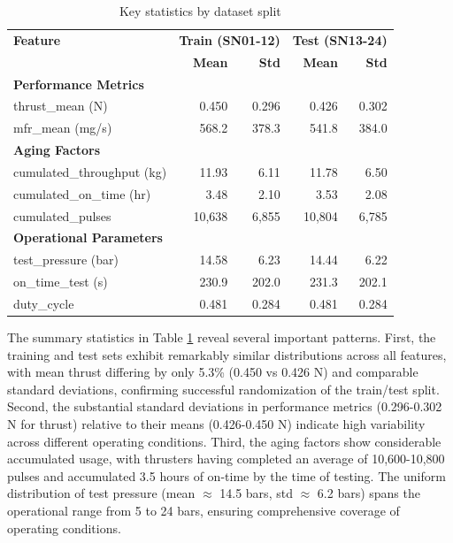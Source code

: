 \documentclass[12pt,a4paper]{article}
\begin{document}
\begin{table}[H]
\centering
\caption{Key statistics by dataset split}
\label{tab:summary_stats}
\small
\begin{tabular}{lrrrr}
\toprule
\textbf{Feature} & \multicolumn{2}{c}{\textbf{Train (SN01-12)}} & \multicolumn{2}{c}{\textbf{Test (SN13-24)}} \\
& \textbf{Mean} & \textbf{Std} & \textbf{Mean} & \textbf{Std} \\
\midrule
\textbf{Performance Metrics} & & & & \\
thrust\_mean (N) & 0.450 & 0.296 & 0.426 & 0.302 \\
mfr\_mean (mg/s) & 568.2 & 378.3 & 541.8 & 384.0 \\
\midrule
\textbf{Aging Factors} & & & & \\
cumulated\_throughput (kg) & 11.93 & 6.11 & 11.78 & 6.50 \\
cumulated\_on\_time (hr) & 3.48 & 2.10 & 3.53 & 2.08 \\
cumulated\_pulses & 10,638 & 6,855 & 10,804 & 6,785 \\
\midrule
\textbf{Operational Parameters} & & & & \\
test\_pressure (bar) & 14.58 & 6.23 & 14.44 & 6.22 \\
on\_time\_test (s) & 230.9 & 202.0 & 231.3 & 202.1 \\
duty\_cycle & 0.481 & 0.284 & 0.481 & 0.284 \\
\bottomrule
\end{tabular}
\end{table}

The summary statistics in Table \ref{tab:summary_stats} reveal several important patterns. First, the training and test sets exhibit remarkably similar distributions across all features, with mean thrust differing by only 5.3\% (0.450 vs 0.426 N) and comparable standard deviations, confirming successful randomization of the train/test split. Second, the substantial standard deviations in performance metrics (0.296-0.302 N for thrust) relative to their means (0.426-0.450 N) indicate high variability across different operating conditions. Third, the aging factors show considerable accumulated usage, with thrusters having completed an average of 10,600-10,800 pulses and accumulated 3.5 hours of on-time by the time of testing. The uniform distribution of test pressure (mean $\approx$ 14.5 bars, std $\approx$ 6.2 bars) spans the operational range from 5 to 24 bars, ensuring comprehensive coverage of operating conditions.
\end{document}
